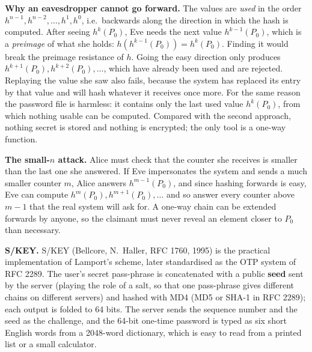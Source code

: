 \textbf{Why an eavesdropper cannot go forward.} The values are \emph{used} in the order $h^{n-1}, h^{n-2}, \dots, h^1, h^0$, i.e.\ backwards along the direction in which the hash is computed. After seeing $h^{k}(P_0)$, Eve needs the next value $h^{k-1}(P_0)$, which is a \emph{preimage} of what she holds: $h(h^{k-1}(P_0)) = h^k(P_0)$. Finding it would break the preimage resistance of $h$. Going the easy direction only produces $h^{k+1}(P_0), h^{k+2}(P_0), \dots$, which have already been used and are rejected. Replaying the value she saw also fails, because the system has replaced its entry by that value and will hash whatever it receives once more. For the same reason the password file is harmless: it contains only the last used value $h^{k}(P_0)$, from which nothing usable can be computed. Compared with the second approach, nothing secret is stored and nothing is encrypted; the only tool is a one-way function.

\textbf{The small-$n$ attack.} Alice must check that the counter she receives is smaller than the last one she answered. If Eve impersonates the system and sends a much smaller counter $m$, Alice answers $h^{m-1}(P_0)$, and since hashing forwards is easy, Eve can compute $h^{m}(P_0), h^{m+1}(P_0), \dots$ and so answer every counter above $m-1$ that the real system will ask for. A one-way chain can be extended forwards by anyone, so the claimant must never reveal an element closer to $P_0$ than necessary.

\textbf{S/KEY.} S/KEY (Bellcore, N.\ Haller, RFC 1760, 1995) is the practical implementation of Lamport's scheme, later standardised as the OTP system of RFC 2289. The user's secret pass-phrase is concatenated with a public \textbf{seed} sent by the server (playing the role of a salt, so that one pass-phrase gives different chains on different servers) and hashed with MD4 (MD5 or SHA-1 in RFC 2289); each output is folded to 64 bits. The server sends the sequence number and the seed as the challenge, and the 64-bit one-time password is typed as six short English words from a 2048-word dictionary, which is easy to read from a printed list or a small calculator.

